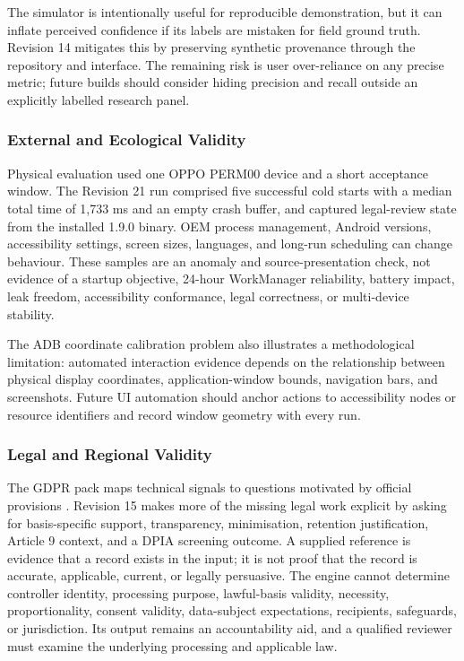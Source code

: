 The simulator is intentionally useful for reproducible demonstration, but it can inflate perceived confidence if its labels are mistaken for field ground truth. Revision 14 mitigates this by preserving synthetic provenance through the repository and interface. The remaining risk is user over-reliance on any precise metric; future builds should consider hiding precision and recall outside an explicitly labelled research panel.

\subsubsection{External and Ecological Validity}

Physical evaluation used one OPPO PERM00 device and a short acceptance window. The Revision 21 run comprised five successful cold starts with a median total time of 1,733 ms and an empty crash buffer, and captured legal-review state from the installed 1.9.0 binary. OEM process management, Android versions, accessibility settings, screen sizes, languages, and long-run scheduling can change behaviour. These samples are an anomaly and source-presentation check, not evidence of a startup objective, 24-hour WorkManager reliability, battery impact, leak freedom, accessibility conformance, legal correctness, or multi-device stability.

The ADB coordinate calibration problem also illustrates a methodological limitation: automated interaction evidence depends on the relationship between physical display coordinates, application-window bounds, navigation bars, and screenshots. Future UI automation should anchor actions to accessibility nodes or resource identifiers and record window geometry with every run.

\subsubsection{Legal and Regional Validity}

The GDPR pack maps technical signals to questions motivated by official provisions \cite{eurlex2016}. Revision 15 makes more of the missing legal work explicit by asking for basis-specific support, transparency, minimisation, retention justification, Article 9 context, and a DPIA screening outcome. A supplied reference is evidence that a record exists in the input; it is not proof that the record is accurate, applicable, current, or legally persuasive. The engine cannot determine controller identity, processing purpose, lawful-basis validity, necessity, proportionality, consent validity, data-subject expectations, recipients, safeguards, or jurisdiction. Its output remains an accountability aid, and a qualified reviewer must examine the underlying processing and applicable law.

